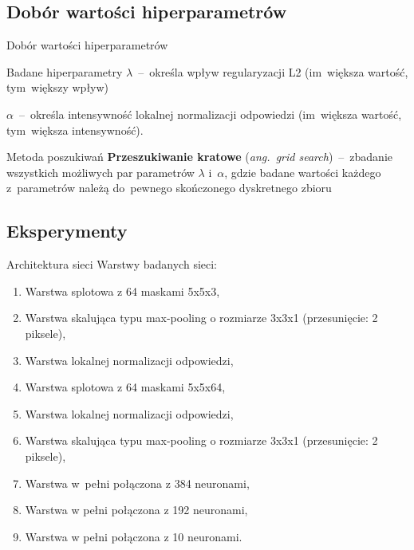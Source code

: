 \documentclass[xcolor=dvipsnames]{beamer}
\begin{document}
\subsection{Dobór wartości hiperparametrów}
\begin{frame}{Dobór wartości hiperparametrów}
    \begin{block}{Badane hiperparametry}
        \textbf{$\lambda$}~--~określa wpływ regularyzacji L2 (im~większa wartość, tym~większy wpływ)

        \vspace{2mm}
        \textbf{$\alpha$}~--~określa intensywność lokalnej normalizacji odpowiedzi (im~większa wartość,
        tym~większa intensywność).
    \end{block}
    \begin{block}{Metoda poszukiwań}
        \textbf{Przeszukiwanie kratowe} (\textit{ang.~grid search})~--~zbadanie wszystkich możliwych par parametrów
        $\lambda$ i~$\alpha$, gdzie badane wartości każdego z~parametrów należą do~pewnego skończonego dyskretnego
        zbioru
    \end{block}
\end{frame}
\subsection{Eksperymenty}
\begin{frame}{Architektura sieci}
    Warstwy badanych sieci:
    \begin{enumerate}
        \item Warstwa splotowa z 64 maskami 5x5x3,
        \item Warstwa skalująca typu max-pooling o rozmiarze 3x3x1 (przesunięcie: 2 piksele),
        \item Warstwa lokalnej normalizacji odpowiedzi,
        \item Warstwa splotowa z 64 maskami 5x5x64,
        \item Warstwa lokalnej normalizacji odpowiedzi,
        \item Warstwa skalująca typu max-pooling o rozmiarze 3x3x1 (przesunięcie: 2 piksele),
        \item Warstwa w~pełni połączona z 384 neuronami,
        \item Warstwa w pełni połączona z 192 neuronami,
        \item Warstwa w pełni połączona z 10 neuronami.
    \end{enumerate}
\end{frame}
\end{document}
